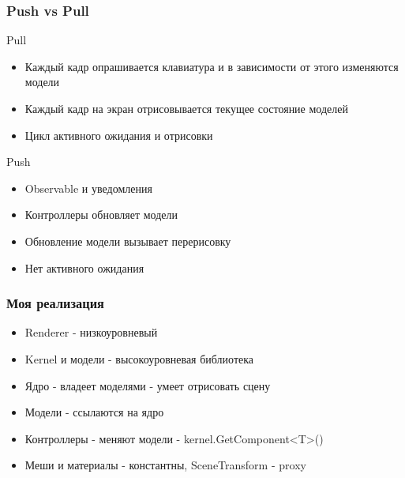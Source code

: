 \documentclass{beamer}
\begin{document}
\begin{frame}
\frametitle{Push vs Pull}
   Pull
   \begin{itemize}
        \item Каждый кадр опрашивается клавиатура и в зависимости от этого изменяются модели
        \item Каждый кадр на экран отрисовывается текущее состояние моделей
        \item Цикл активного ожидания и отрисовки
   \end{itemize}
   Push
   \begin{itemize}
    \item Observable и уведомления
    \item Контроллеры обновляет модели
    \item Обновление модели вызывает перерисовку
    \item Нет активного ожидания
   \end{itemize}
\end{frame}
\begin{frame}
\frametitle{Моя реализация}

    \begin{itemize}
        \item Renderer - низкоуровневый
        \item Kernel и модели - высокоуровневая библиотека
   \end{itemize}
   \pause
   \begin{itemize}
        \item Ядро - владеет моделями - умеет отрисовать сцену
        \item Модели - ссылаются на ядро
        \item Контроллеры - меняют модели - kernel.GetComponent<T>()
        \item Меши и материалы - константны, SceneTransform - proxy
   \end{itemize}
\end{frame}
\end{document}
